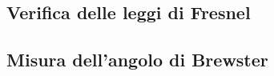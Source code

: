 \subsection{Verifica delle leggi di Fresnel}\label{subsec:leggi-di-fresnel}
  \blindtext[2]
\subsection{Misura dell'angolo di Brewster}\label{subsec:angolo-di-brewster}
  \blindtext[2]
\endinput
